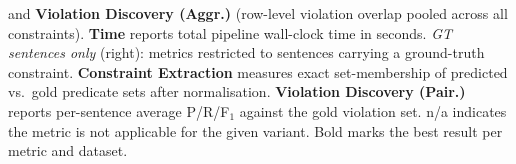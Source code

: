 \begin{table}[t]
{    and \textbf{Violation Discovery (Aggr.)} (row-level violation overlap pooled across all
    constraints). \textbf{Time} reports total pipeline wall-clock time in seconds.
    \textit{GT sentences only} (right): metrics restricted to sentences carrying a
    ground-truth constraint.
    \textbf{Constraint Extraction} measures exact set-membership of predicted vs.\ gold
    predicate sets after normalisation.
    \textbf{Violation Discovery (Pair.)} reports per-sentence average P/R/F$_1$ against
    the gold violation set.
    n/a indicates the metric is not applicable for the given variant.
    Bold marks the best result per metric and dataset.%
  }
  \label{tab:main_results}
\end{table}